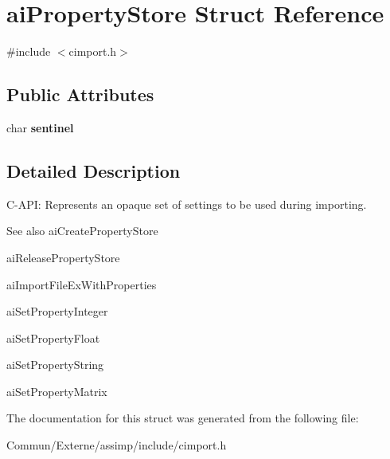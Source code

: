 \hypertarget{structai_property_store}{}\section{ai\+Property\+Store Struct Reference}
\label{structai_property_store}


{\ttfamily \#include $<$cimport.\+h$>$}

\subsection*{Public Attributes}
\begin{DoxyCompactItemize}
\item 
char {\bfseries sentinel}\hypertarget{structai_property_store_a53e97983bdbe38c596c7879555dc42a3}{}\label{structai_property_store_a53e97983bdbe38c596c7879555dc42a3}

\end{DoxyCompactItemize}


\subsection{Detailed Description}
C-\/\+A\+PI\+: Represents an opaque set of settings to be used during importing. \begin{DoxySeeAlso}{See also}
ai\+Create\+Property\+Store 

ai\+Release\+Property\+Store 

ai\+Import\+File\+Ex\+With\+Properties 

ai\+Set\+Property\+Integer 

ai\+Set\+Property\+Float 

ai\+Set\+Property\+String 

ai\+Set\+Property\+Matrix 
\end{DoxySeeAlso}


The documentation for this struct was generated from the following file\+:\begin{DoxyCompactItemize}
\item 
Commun/\+Externe/assimp/include/cimport.\+h\end{DoxyCompactItemize}

